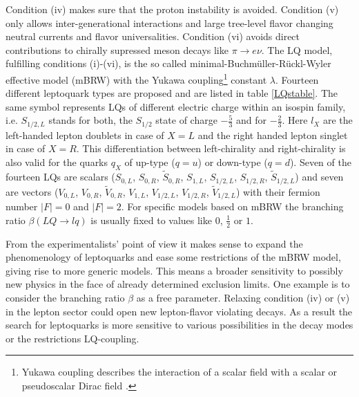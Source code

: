 Condition (iv) makes sure that the proton instability is avoided. Condition (v) only allows inter-generational interactions and large tree-level flavor changing neutral currents and flavor universalities. Condition (vi) avoids direct contributions to chirally supressed meson decays like $\pi\rightarrow e\nu$. The LQ model, fulfilling conditions (i)-(vi), is the so called minimal-Buchm\"{u}ller-R\"{u}ckl-Wyler effective model (mBRW) with the Yukawa coupling\footnote{Yukawa coupling describes the interaction of a scalar field with a scalar or pseudoscalar Dirac field \cite{Peskin}.} constant $\lambda$. \cite{Kuze}\newline
Fourteen different leptoquark types are proposed and are listed in table \ref{LQstable}. The same symbol represents LQs of different electric charge within an isospin family, i.e. $S_{1/2,L}$ stands for both, the $S_{1/2}$ state of charge $-\frac53$ and for $-\frac23$. Here $l_X$ are the left-handed lepton doublets in case of $X=L$ and the right handed lepton singlet in case of $X=R$. This differentiation between left-chirality and right-chirality is also valid for the quarks $q_X$ of up-type ($q=u$) or down-type ($q=d$). Seven of the fourteen LQs are scalars ($S_{0,L}$, $S_{0,R}$, $\tilde{S}_{0,R}$, $S_{1,L}$, $S_{1/2,L}$, $S_{1/2,R}$, $\tilde{S}_{1/2,L}$) and seven are vectors ($V_{0,L}$, $V_{0,R}$, $\tilde{V}_{0,R}$, $V_{1,L}$, $V_{1/2,L}$, $V_{1/2,R}$, $\tilde{V}_{1/2,L}$) with their fermion number $|F|=0$ and $|F|=2$. For specific models based on mBRW the branching ratio $\beta(LQ\rightarrow lq)$ is usually fixed to values like $0$, $\frac12$ or $1$. \cite{Kuze}\par
From the experimentalists' point of view it makes sense to expand the phenomenology of leptoquarks and ease some restrictions of the mBRW model, giving rise to more generic models. This means a broader sensitivity to possibly new physics in the face of already determined exclusion limits. One example is to consider the  branching ratio $\beta$ as a free parameter. Relaxing condition (iv) or (v) in the lepton sector could open new lepton-flavor violating decays. As a result the search for leptoquarks is more sensitive to various possibilities in the decay modes or the restrictions LQ-coupling. \cite{Kuze}
%
%
